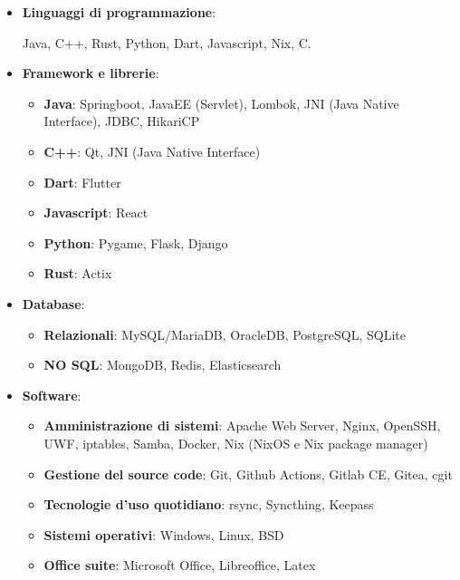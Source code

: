 \documentclass{paper}
\begin{document}
\begin{itemize}
    \item \textbf{Linguaggi di programmazione}:

    Java, C++, Rust, Python, Dart, Javascript, Nix, C.

    \item \textbf{Framework e librerie}:
    
    \begin{itemize}
        \item \textbf{Java}: Springboot, JavaEE (Servlet), Lombok, JNI (Java Native Interface), JDBC, HikariCP
        \item \textbf{C++}: Qt, JNI (Java Native Interface)
        \item \textbf{Dart}: Flutter
        \item \textbf{Javascript}: React
        \item \textbf{Python}: Pygame, Flask, Django
        \item \textbf{Rust}: Actix
    \end{itemize}

    \item \textbf{Database}:


    \begin{itemize}
        \item \textbf{Relazionali}: MySQL/MariaDB, OracleDB, PostgreSQL, SQLite
        \item \textbf{NO SQL}: MongoDB, Redis, Elasticsearch
    \end{itemize}

    \item \textbf{Software}:

    \begin{itemize}
        \item \textbf{Amministrazione di sistemi}: Apache Web Server, Nginx, OpenSSH, UWF, iptables, Samba, Docker, Nix (NixOS e Nix package manager)
        \item \textbf{Gestione del source code}: Git, Github Actions, Gitlab CE, Gitea, cgit
        \item \textbf{Tecnologie d'uso quotidiano}: rsync, Syncthing, Keepass
        \item \textbf{Sistemi operativi}: Windows, Linux, BSD
        \item \textbf{Office suite}: Microsoft Office, Libreoffice, Latex
    \end{itemize}
\end{itemize}
\end{document}
